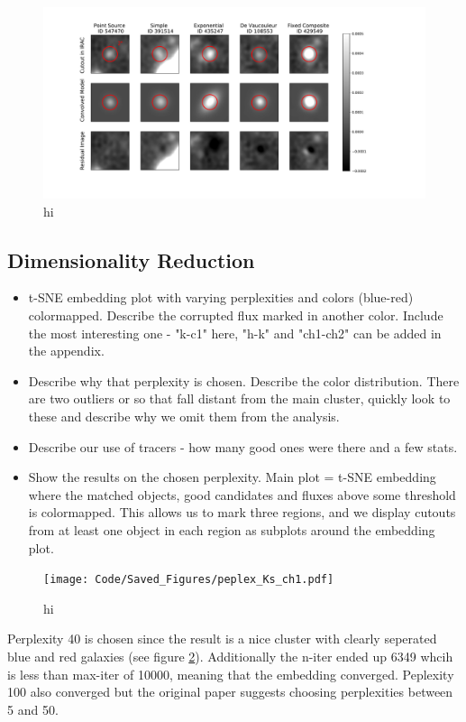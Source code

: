 \begin{figure}[h!]
    \centering
    \includegraphics[trim={3cm 2.5cm 5cm 1.5cm},clip,scale=0.5]{Code/Saved_Figures/Model_cutouts.pdf}
    \caption{hi}
    \label{Model_cutouts}
\end{figure}

\subsection{Dimensionality Reduction}
\begin{itemize}
    \item t-SNE embedding plot with varying perplexities and colors (blue-red) colormapped. Describe the corrupted flux marked in another color. Include the most interesting one - "k-c1" here, "h-k" and "ch1-ch2" can be added in the appendix.
    \item Describe why that perplexity is chosen. Describe the color distribution. There are two outliers or so that fall distant from the main cluster, quickly look to these and describe why we omit them from the analysis.
    \item Describe our use of tracers - how many good ones were there and a few stats.
    \item Show the results on the chosen perplexity. Main plot = t-SNE embedding where the matched objects, good candidates and fluxes above some threshold is colormapped. This allows us to mark three regions, and we display cutouts from at least one object in each region as subplots around the embedding plot.
\end{itemize}

\begin{figure}[h!]
    \centering
    \texttt{[image: Code/Saved\_Figures/peplex\_Ks\_ch1.pdf]}
    \caption{hi}
    \label{embeddding_ks_ch1}
\end{figure}
Perplexity 40 is chosen since the result is a nice cluster with clearly seperated blue and red galaxies (see figure \ref{embeddding_ks_ch1}). Additionally the n-iter ended up 6349 whcih is less than max-iter of 10000, meaning that the embedding converged. Peplexity 100 also converged but the original paper \cite{Maaten_2008_tSNE} suggests choosing perplexities between 5 and 50.

